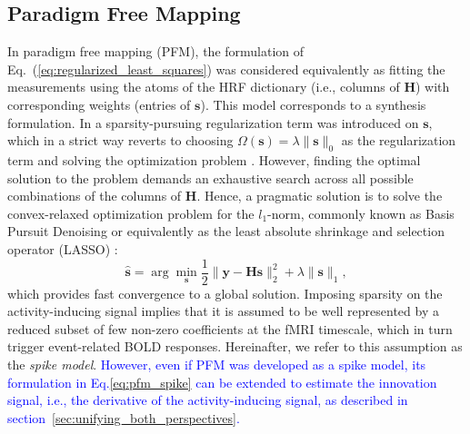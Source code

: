 \subsection{Paradigm Free Mapping}
 In paradigm free mapping (PFM), the formulation of
 Eq.~(\ref{eq:regularized_least_squares}) was considered equivalently as fitting
 the measurements using the atoms of the HRF dictionary (i.e., columns of
 $\mathbf{H}$) with corresponding weights (entries of $\mathbf{s}$). This model
 corresponds to a synthesis formulation. In
 \citealt{Gaudes2013Paradigmfreemapping} a sparsity-pursuing regularization term
 was introduced on $\mathbf{s}$, which in a strict way reverts to choosing
 \(\Omega(\mathbf{s})=\lambda \| \mathbf{s} \|_0\) as the regularization term
 and solving the optimization problem
 \citep{Bruckstein2009SparseSolutionsSystems}. However, finding the optimal
 solution to the problem demands an exhaustive search across all possible
 combinations of the columns of \(\mathbf{H}\). Hence, a  pragmatic solution is
 to solve the convex-relaxed optimization problem for the \(l_1\)-norm, commonly
 known as Basis Pursuit Denoising \citep{Chen2001BasisPursuitDenoising} or
 equivalently as the least absolute shrinkage and selection operator (LASSO)
 \citep{Tibshirani1996RegressionShrinkageSelection}: 
\begin{equation}
    \label{eq:pfm_spike}
    \hat{\mathbf{s}} = \arg \min_{\mathbf{s}} \frac{1}{2} \| \mathbf{y} - \mathbf{Hs} \|_2^2 + \lambda \| \mathbf{s} \|_1,
\end{equation}
which provides fast convergence to a global solution. Imposing sparsity on the
activity-inducing signal implies that it is assumed to be well represented by a
reduced subset of few non-zero coefficients at the fMRI timescale, which in turn
trigger event-related BOLD responses. Hereinafter, we refer to this assumption
as the \textit{spike model}. \textcolor{blue}{However, even if PFM was developed
as a spike model, its formulation in Eq.\eqref{eq:pfm_spike} can be extended to
estimate the innovation signal, i.e., the derivative of the activity-inducing
signal, as described in section~\ref{sec:unifying_both_perspectives}.}


